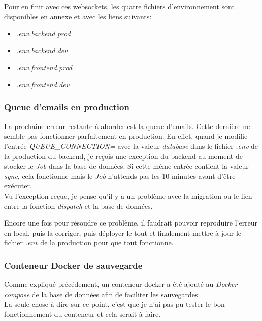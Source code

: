 \documentclass[
    iai, %
    il, %
]{heig-tb}
\begin{document}
Pour en finir avec ces \Gls{websockets}, les quatre fichiers d'environnement sont disponibles en annexe et avec les liens suivants:
\begin{itemize}
    \item \href{https://github.com/heig-fablab/fablab-manager/blob/main/.env.prod.example}{\emph{.env.backend.prod}}
    \item \href{https://github.com/heig-fablab/fablab-manager/blob/main/.env.dev.example}{\emph{.env.backend.dev}}
    \item \href{https://github.com/heig-fablab/fablab-manager-frontend/blob/main/.env.prod.example}{\emph{.env.frontend.prod}}
    \item \href{https://github.com/heig-fablab/fablab-manager-frontend/blob/main/.env.dev.example}{\emph{.env.frontend.dev}}
\end{itemize}

\subsubsection{Queue d'emails en production}
La prochaine erreur restante à aborder est la queue d'emails. Cette dernière ne semble pas fonctionner parfaitement en production. En effet, quand je modifie l'entrée \emph{QUEUE_CONNECTION=} avec la valeur \emph{database} dans le fichier \emph{.env} de la production du \Gls{backend}, je reçois une exception du \Gls{backend} au moment de stocker le \emph{Job} dans la base de données. Si cette même entrée contient la valeur \emph{sync}, cela fonctionne mais le \emph{Job} n'attends pas les 10 minutes avant d'être exécuter. \\
Vu l'exception reçue, je pense qu'il y a un problème avec la migration ou le lien entre la fonction \emph{dispatch} et la base de données.

Encore une fois pour résoudre ce problème, il faudrait pouvoir reproduire l'erreur en local, puis la corriger, puis déployer le tout et finalement mettre à jour le fichier \emph{.env} de la production pour que tout fonctionne.

\subsubsection{Conteneur Docker de sauvegarde}
Comme expliqué précédement, un \Gls{conteneur} \Gls{docker} a été ajouté au \emph{Docker-compose} de la base de données afin de faciliter les sauvegardes.\\
La seule chose à dire sur ce point, c'est que je n'ai pas pu tester le bon fonctionnement du \Gls{conteneur} et cela serait à faire.
\end{document}
